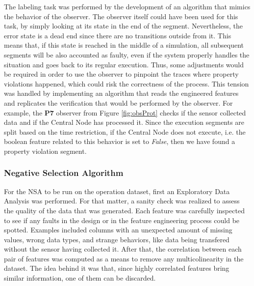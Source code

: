 The labeling task was performed by the development of an algorithm that mimics the behavior of the observer. The observer itself could have been used for this task, by simply looking at its state in the end of the segment. Nevertheless, the error state is a dead end since there are no transitions outside from it. This means that, if this state is reached in the middle of a simulation, all subsequent segments will be also accounted as faulty, even if the system properly handles the situation and goes back to its regular execution. Thus, some adjustments would be required in order to use the observer to pinpoint the traces where property violations happened, which could risk the correctness of the process. This tension was handled by implementing an algorithm that reads the engineered features and replicates the verification that would be performed by the observer. For example, the \textbf{P7} observer from Figure \ref{fig:obsProt} checks if the sensor collected data and if the Central Node has processed it. Since the execution segments are split based on the time restriction, if the Central Node does not execute, i.e. the boolean feature related to this behavior is set to \textit{False}, then we have found a property violation segment. 

\subsubsection{Negative Selection Algorithm}

For the NSA to be run on the operation dataset, first an Exploratory Data Analysis was performed. For that matter, a sanity check was realized to assess the quality of the data that was generated. Each feature was carefully inspected to see if any faults in the design or in the feature engineering process could be spotted. Examples included columns with an unexpected amount of missing values, wrong data types, and strange behaviors, like data being transfered without the sensor having collected it. After that, the correlation between each pair of features was computed as a means to remove any multicolinearity in the dataset. The idea behind it was that, since highly correlated features bring similar information, one of them can be discarded.

